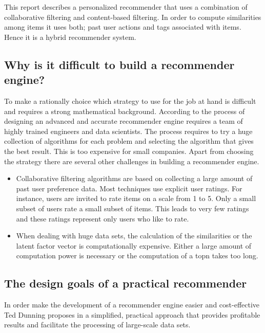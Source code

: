 This report describes a personalized recommender that uses a combination of collaborative filtering and content-based filtering. In order to compute similarities among items it uses both; past user actions and \glspl{tag} associated with items. Hence it is a hybrid recommender system.

\subsection{Why is it difficult to build a recommender engine?}

To make a rationally choice which strategy to use for the job at hand is difficult and requires a strong mathematical background. According to \cite{Dunning14} the process of designing an advanced and accurate recommender engine requires a team of highly trained engineers and data scientists. The process requires to try a huge collection of algorithms for each problem and selecting the algorithm that gives the best result. This is too expensive for small companies. Apart from choosing the strategy there are several other challenges in building a recommender engine.

\begin{itemize}
\item Collaborative filtering algorithms are based on\- col\-lect\-ing a large a\-mount of past user preference data. Most techniques use explicit user ratings. For instance, users are invited to rate items on a scale from 1 to 5. Only a small subset of users rate a small subset of items. This leads to very few ratings and these ratings represent only users who like to rate.

\item When dealing with huge data sets, the calculation of the similarities or the latent factor vector is computationally expensive. Either a large amount of computation power is necessary or the computation of a \gls{topn} takes too long.
\end{itemize}

\subsection{The design goals of a practical recommender}
\label{sec:practical}

In order make the development of a recommender engine easier and cost-effective Ted Dunning  proposes in \cite{Dunning14} a simplified, practical approach that provides profitable results and facilitate the processing of large-scale data sets. 

